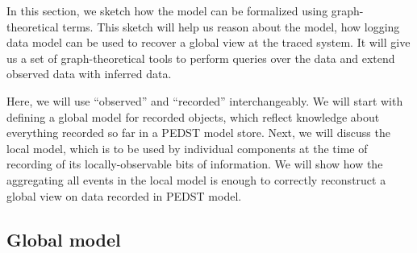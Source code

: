 In this section, we sketch how the model can be formalized using graph-theoretical terms. This sketch will help us reason about the model, how logging data model can be used to recover a global view at the traced system. It will give us a set of graph-theoretical tools to perform queries over the data and extend observed data with inferred data.

\begin{comment}
We will analyze the proposed local and global data models to prove a number of properties\todo{Sync with motivation}, which are important for our use cases. BIG TODO:

\begin{itemize}
	\item Consistency -- traces describe what actually happened during execution ~\cite{cheney2008provenance}
	\item Local-global coherency -- ensuring that if logging is performed correctly in all agents participating in the system, the global provenance data can be recovered from local logging
	\item Granular fidelity -- traces explain how the expression would behave if the inputs were changed.
	\item Variable fidelity -- data fidelity during logging can be adjusted by the implementer of provenance logging in a given agent depending on level of details necessary for a given use case.
	\item Aggregability -- ability to meaningfully aggregate provenance data in global data model when represented for human consumption
\end{itemize}

\end{comment}

Here, we will use ``observed'' and ``recorded''  interchangeably. We will start with defining a global model for recorded objects, which reflect knowledge about everything recorded so far in a PEDST model store. Next, we will discuss the local model, which is to be used by individual components at the time of recording of its locally-observable bits of information. We will show how the aggregating all events in the local model is enough to correctly reconstruct a global view on data recorded in PEDST model.

\subsection{Global model}\label{sec:global-model}

